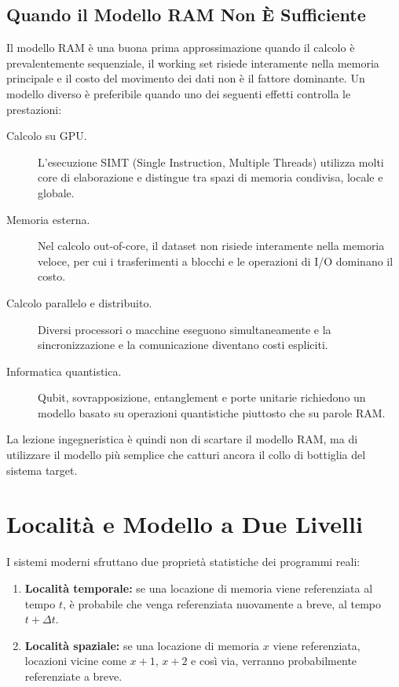 \subsection{Quando il Modello RAM Non È Sufficiente}

Il modello RAM è una buona prima approssimazione quando il calcolo è prevalentemente sequenziale, il working set risiede interamente nella memoria principale e il costo del movimento dei dati non è il fattore dominante. Un modello diverso è preferibile quando uno dei seguenti effetti controlla le prestazioni:

\begin{description}
  \item[Calcolo su GPU.] L'esecuzione SIMT (Single Instruction, Multiple Threads) utilizza molti core di elaborazione e distingue tra spazi di memoria condivisa, locale e globale.
  \item[Memoria esterna.] Nel calcolo out-of-core, il dataset non risiede interamente nella memoria veloce, per cui i trasferimenti a blocchi e le operazioni di I/O dominano il costo.
  \item[Calcolo parallelo e distribuito.] Diversi processori o macchine eseguono simultaneamente e la sincronizzazione e la comunicazione diventano costi espliciti.
  \item[Informatica quantistica.] Qubit, sovrapposizione, entanglement e porte unitarie richiedono un modello basato su operazioni quantistiche piuttosto che su parole RAM.
\end{description}

La lezione ingegneristica è quindi non di scartare il modello RAM, ma di utilizzare il modello più semplice che catturi ancora il collo di bottiglia del sistema target.

\section{Località e Modello a Due Livelli}
\label{sec:external-memory}

I sistemi moderni sfruttano due proprietà statistiche dei programmi reali:

\begin{enumerate}
  \item \textbf{Località temporale:} se una locazione di memoria viene referenziata al tempo $t$, è probabile che venga referenziata nuovamente a breve, al tempo $t + \Delta t$.
  \item \textbf{Località spaziale:} se una locazione di memoria $x$ viene referenziata, locazioni vicine come $x+1$, $x+2$ e così via, verranno probabilmente referenziate a breve.
\end{enumerate}

